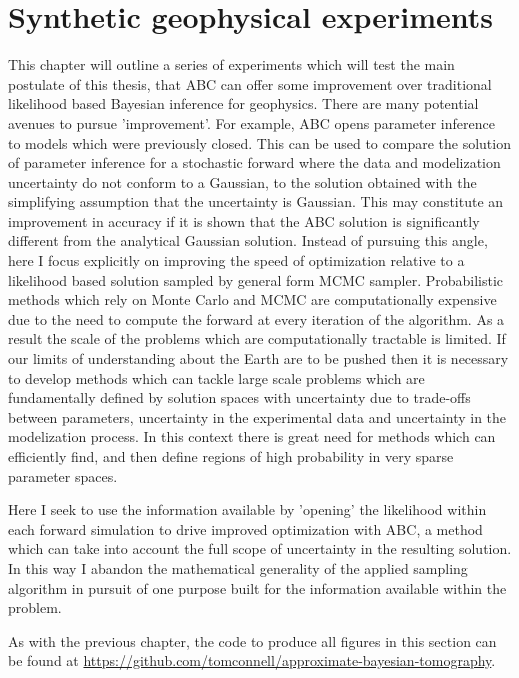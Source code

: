 \chapter{Synthetic geophysical experiments}
\label{SGE}
This chapter will outline a series of experiments which will test the main postulate of this thesis, that ABC can offer some improvement over traditional likelihood based Bayesian inference for geophysics. There are many potential avenues to pursue 'improvement'. For example, ABC opens parameter inference to models which were previously closed. This can be used to compare the solution of parameter inference for a stochastic forward where the data and modelization uncertainty do not conform to a Gaussian, to the solution obtained with the simplifying assumption that the uncertainty is Gaussian. This may constitute an improvement in accuracy if it is shown that the ABC solution is significantly different from the analytical Gaussian solution. Instead of pursuing this angle, here I focus explicitly on improving the speed of optimization relative to a likelihood based solution sampled by general form MCMC sampler. Probabilistic methods which rely on Monte Carlo and MCMC are computationally expensive due to the need to compute the forward at every iteration of the algorithm. As a result the scale of the problems which are computationally tractable is limited. If our limits of understanding about the Earth are to be pushed then it is necessary to develop methods which can tackle large scale problems which are fundamentally defined by solution spaces with uncertainty due to trade-offs between parameters, uncertainty in the experimental data and uncertainty in the modelization process. In this context there is great need for methods which can efficiently find, and then define regions of high probability in very sparse parameter spaces. \par

Here I seek to use the information available by 'opening' the likelihood within each forward simulation to drive improved optimization with ABC, a method which can take into account the full scope of uncertainty in the resulting solution. In this way I abandon the mathematical generality of the applied sampling algorithm in pursuit of one purpose built for the information available within the problem. \par

As with the previous chapter, the code to produce all figures in this section can be found at \url{https://github.com/tomconnell/approximate-bayesian-tomography}.\par


